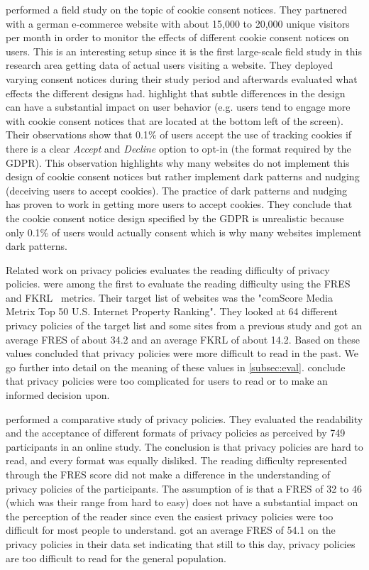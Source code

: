  performed a field study on the topic of cookie consent notices. They partnered with a german
e-commerce website with about 15,000 to 20,000 unique visitors per month in order to monitor the effects of different
cookie consent notices on users. This is an interesting setup since it is the first large-scale field study in this
research area getting data of actual users visiting a website. They deployed varying consent notices during their
study period and afterwards evaluated what effects the different designs had. \citeauthor{utz2019informed} highlight
that subtle differences in the design can have a substantial impact on user behavior (e.g. users tend to engage more
with cookie consent notices that are located at the bottom left of the screen). Their observations show that 0.1\% of
users accept the use of tracking cookies if there is a clear \emph{Accept} and \emph{Decline} option to opt-in (the
format required by the GDPR). This observation highlights why many websites do not implement this design of cookie
consent notices but rather implement dark patterns and nudging (deceiving users to accept cookies). The practice of dark
patterns and nudging has proven to work in getting more users to accept cookies. They conclude that the cookie consent
notice design specified by the GDPR is unrealistic because only 0.1\% of users would actually consent which is why many
websites implement dark patterns.

Related work on privacy policies evaluates the reading difficulty of privacy policies.  were among
the first to evaluate the reading difficulty using the FRES~\cite{flesch1948new} and FKRL~\cite{kincaid1975derivation} metrics.
Their target list of websites was the "comScore Media Metrix Top 50 U.S. Internet Property Ranking".
They looked at 64 different privacy policies of the target list and some sites from a previous study and got
an average FRES of about 34.2 and an average FKRL of about 14.2.
Based on these values  concluded that privacy policies were more difficult to read in the past.
We go further into detail on the meaning of these values in \autoref{subsec:eval}. \citeauthor{jensen2004privacy}
conclude that privacy policies were too complicated for users to read or to make an informed decision upon.

 performed a comparative study of privacy policies. They evaluated the readability and the
acceptance of different formats of privacy policies as perceived by 749 participants in an online study. The conclusion
is that privacy policies are hard to read, and every format was equally disliked. The reading difficulty represented
through the FRES score did not make a difference in the understanding of privacy policies of the participants.
The assumption of \citeauthor{mcdonald2009comparative} is that a FRES of 32
to 46 (which was their range from hard to easy) does not have a substantial impact on the perception of the reader since even the easiest
privacy policies were too difficult for most people to understand. \citeauthor{sanchez2019can} got an average FRES of
54.1 on the privacy policies in their data set indicating that still to this day, privacy policies are too difficult
to read for the general population.

